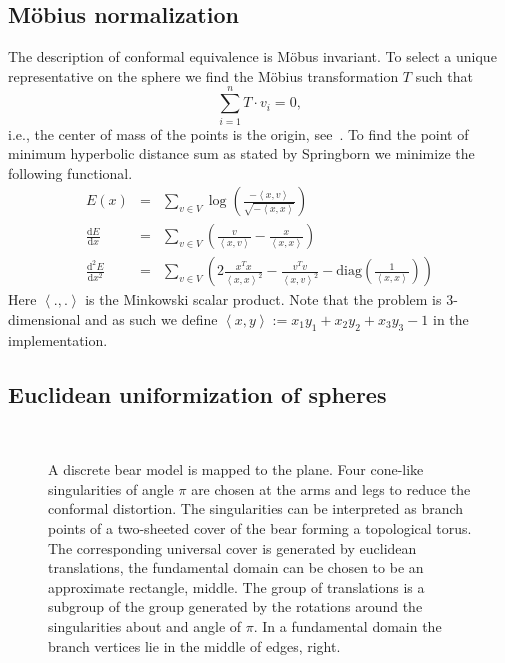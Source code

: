 \documentclass[Thesis]{subfiles}
\begin{document}
\subsection{M{\"o}bius normalization}
\label{sec:moebius_normalization}
The description of conformal equivalence is M{\"o}bus invariant.  
To select a unique representative on the sphere we find the M{\"o}bius transformation $T$ such that
\[\sum_{i=1}^{n}T\cdot v_i = 0,\]
i.e., the center of mass of the points is the origin, see~\cite{Springborn05}.
To find the point of minimum hyperbolic distance sum as stated by Springborn we minimize the following functional. 
\begin{eqnarray*} 
	E(x) &=& \sum_{v\in V}\log\left(\frac{-\left<x,v\right>}{\sqrt{-\left<x,x\right>}}\right)\\
	\frac{\mathrm d E}{\mathrm dx} &=& \sum_{v\in V}\left(\frac{v}{\left<x,v\right>} - \frac{x}{\left<x,x\right>}\right)\\
	\frac{\mathrm d^2 E}{\mathrm dx^2} &=& \sum_{v\in V}\left(2\frac{x^Tx}{\left<x,x\right>^2}-\frac{v^Tv}{\left<x,v\right>^2} - \mathrm{diag}\left(\frac{1}{\left<x,x\right>}\right)\right)
\end{eqnarray*}
Here $\left<.,.\right>$ is the Minkowski scalar product. Note that the problem is
 $3$-dimensional and as such we define $\left<x,y\right>:=x_1y_1+x_2y_2+x_3y_3-1$ in
the implementation.

\subsection{Euclidean uniformization of spheres}

\begin{figure}
\centering
{}\\
\caption{
A discrete bear model is mapped to the plane.
Four cone-like singularities of angle $\pi$ are chosen at the arms and legs to reduce the conformal distortion.
The singularities can be interpreted as branch points of a two-sheeted cover of the bear forming a topological torus.
The corresponding universal cover is generated by euclidean translations, the fundamental domain can be chosen to be an approximate rectangle, middle.
The group of translations is a subgroup of the group generated by the rotations around the singularities about and angle of $\pi$. In a fundamental domain the branch vertices lie in the middle of edges, right.
}
\label{fig:bear}
\end{figure}
\end{document}
